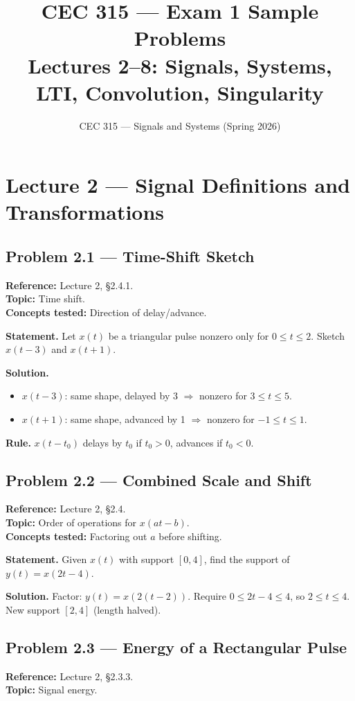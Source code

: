 \documentclass[11pt]{article}
\title{CEC 315 --- Exam 1 Sample Problems\\\large Lectures 2--8: Signals, Systems, LTI, Convolution, Singularity}
\author{CEC 315 --- Signals and Systems (Spring 2026)}
\date{}
\begin{document}
\maketitle
\tableofcontents
\newpage

\section{Lecture 2 --- Signal Definitions and Transformations}

\subsection{Problem 2.1 --- Time-Shift Sketch}
\textbf{Reference:} Lecture 2, \S 2.4.1.\\
\textbf{Topic:} Time shift.\\
\textbf{Concepts tested:} Direction of delay/advance.

\textbf{Statement.} Let $x(t)$ be a triangular pulse nonzero only for $0\le t\le 2$. Sketch $x(t-3)$ and $x(t+1)$.

\textbf{Solution.}
\begin{itemize}[leftmargin=*]
  \item $x(t-3)$: same shape, delayed by 3 $\Rightarrow$ nonzero for $3\le t\le 5$.
  \item $x(t+1)$: same shape, advanced by 1 $\Rightarrow$ nonzero for $-1\le t\le 1$.
\end{itemize}
\textbf{Rule.} $x(t-t_0)$ delays by $t_0$ if $t_0>0$, advances if $t_0<0$.

\subsection{Problem 2.2 --- Combined Scale and Shift}
\textbf{Reference:} Lecture 2, \S 2.4.\\
\textbf{Topic:} Order of operations for $x(at-b)$.\\
\textbf{Concepts tested:} Factoring out $a$ before shifting.

\textbf{Statement.} Given $x(t)$ with support $[0,4]$, find the support of $y(t)=x(2t-4)$.

\textbf{Solution.} Factor: $y(t)=x(2(t-2))$. Require $0\le 2t-4\le 4$, so $2\le t\le 4$. New support $[2,4]$ (length halved).

\subsection{Problem 2.3 --- Energy of a Rectangular Pulse}
\textbf{Reference:} Lecture 2, \S 2.3.3.\\
\textbf{Topic:} Signal energy.
\end{document}
